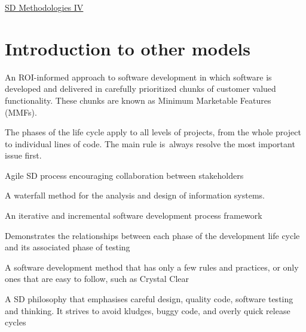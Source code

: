 \documentclass{article}[18pt]
\begin{document}
\begin{center}
\underline{\huge SD Methodologies IV}
\end{center}
\section{Introduction to other models}
\begin{defin}
An ROI-informed approach to software development in which software is developed and delivered in carefully prioritized chunks of customer valued functionality. These chunks are known as Minimum Marketable Features (MMFs).
\end{defin}

\begin{defin}
 The phases of the life cycle apply to all levels of projects, from the whole project to individual lines of code. The main rule is always resolve the most important issue first.
\end{defin}


\begin{defin}[BDD]
Agile SD process encouraging collaboration between stakeholders
\end{defin}

\begin{defin}
 A waterfall method for the analysis and design of information systems.
\end{defin}

\begin{defin}
 An iterative and incremental software development process framework
\end{defin}

\begin{defin}[V-model]
Demonstrates the relationships between each phase of the development life cycle and its associated phase of testing 
\end{defin}

\begin{defin}[Lightweight]
A software development method that has only a few rules and practices, or only ones that are easy to follow, such as Crystal Clear
\end{defin}

\begin{defin}
A SD philosophy that emphasises careful design, quality code, software testing and thinking. It strives to avoid kludges, buggy code, and overly quick release cycles
\end{defin}
\end{document}
